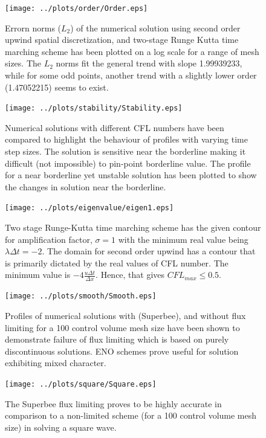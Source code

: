 \documentclass[a4paper,10pt]{article}
\begin{document}
\begin{figure}
  \centering
  \texttt{[image: ../plots/order/Order.eps]}
  \caption{Errorn norms ($L_2$) of the numerical solution using second order upwind spatial discretization, and two-stage Runge Kutta time marching scheme has been plotted on a log scale for a range of mesh sizes. The $L_2$ norms fit the general trend with slope 1.99939233, while for some odd points, another trend with a slightly lower order (1.47052215) seems to exist.}                
  \label{norms}
\end{figure}

\begin{figure}
  \centering
  \texttt{[image: ../plots/stability/Stability.eps]}
  \caption{Numerical solutions with different CFL numbers have been compared to highlight the behaviour of profiles with varying time step sizes. The solution is sensitive near the borderline making it difficult (not impossible) to pin-point borderline value. The profile for a near borderline yet unstable solution has been plotted to show the changes in solution near the borderline.}                
  \label{stability}
\end{figure}
 
\begin{figure}
  \centering
  \texttt{[image: ../plots/eigenvalue/eigen1.eps]}
  \caption{Two stage Runge-Kutta time marching scheme has the given contour for amplification factor, $\sigma = 1$ with the minimum real value being $\lambda \Delta t = -2$. The domain for second order upwind has a contour that is primarily dictated by the real values of CFL number. The minimum value is $-4\frac{u\Delta t}{\Delta x}$. Hence, that gives $CFL_{max}\leq 0.5$.}                
  \label{rk2}
\end{figure}
 
\begin{figure}
  \centering
  \texttt{[image: ../plots/smooth/Smooth.eps]}
  \caption{Profiles of numerical solutions with (Superbee), and without flux limiting for a 100 control volume mesh size have been shown to demonstrate failure of flux limiting which is based on purely discontinuous solutions. ENO schemes prove useful for solution exhibiting mixed character.}                
  \label{smooth}

\end{figure}
 
\begin{figure}
  \centering
  \texttt{[image: ../plots/square/Square.eps]}
  \caption{The Superbee flux limiting proves to be highly accurate in comparison to a non-limited scheme (for a 100 control volume mesh size) in solving a square wave.}                
  \label{square}
\end{figure}
 
\end{document}
